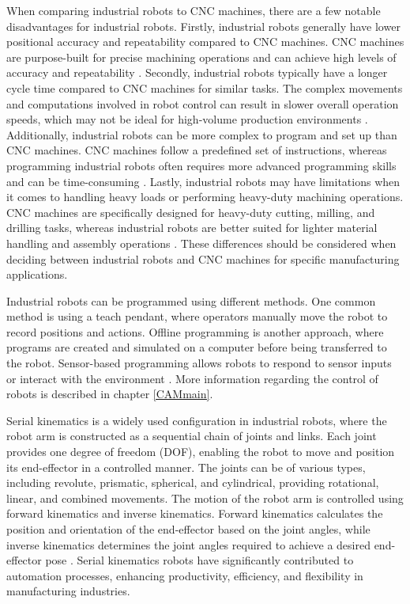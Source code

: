 When comparing industrial robots to CNC machines, there are a few notable disadvantages for industrial robots. Firstly, industrial robots generally have lower positional accuracy and repeatability compared to CNC machines. CNC machines are purpose-built for precise machining operations and can achieve high levels of accuracy and repeatability \cite{Wang.2023}.
Secondly, industrial robots typically have a longer cycle time compared to CNC machines for similar tasks. The complex movements and computations involved in robot control can result in slower overall operation speeds, which may not be ideal for high-volume production environments \cite{Joshi.2021}.
Additionally, industrial robots can be more complex to program and set up than CNC machines. CNC machines follow a predefined set of instructions, whereas programming industrial robots often requires more advanced programming skills and can be time-consuming \cite{Ye.2022}. Lastly, industrial robots may have limitations when it comes to handling heavy loads or performing heavy-duty machining operations. CNC machines are specifically designed for heavy-duty cutting, milling, and drilling tasks, whereas industrial robots are better suited for lighter material handling and assembly operations \cite{Wu.2022}. These differences should be considered when deciding between industrial robots and CNC machines for specific manufacturing applications.

Industrial robots can be programmed using different methods. One common method is using a teach pendant, where operators manually move the robot to record positions and actions. Offline programming is another approach, where programs are created and simulated on a computer before being transferred to the robot. Sensor-based programming allows robots to respond to sensor inputs or interact with the environment \cite{Heimann.2020}. More information regarding the control of robots is described in chapter \ref{CAMmain}.


Serial kinematics is a widely used configuration in industrial robots, where the robot arm is constructed as a sequential chain of joints and links. Each joint provides one degree of freedom (DOF), enabling the robot to move and position its end-effector in a controlled manner. The joints can be of various types, including revolute, prismatic, spherical, and cylindrical, providing rotational, linear, and combined movements. The motion of the robot arm is controlled using forward kinematics and inverse kinematics. Forward kinematics calculates the position and orientation of the end-effector based on the joint angles, while inverse kinematics determines the joint angles required to achieve a desired end-effector pose \cite{Singh.2021b}. Serial kinematics robots have significantly contributed to automation processes, enhancing productivity, efficiency, and flexibility in manufacturing industries.


